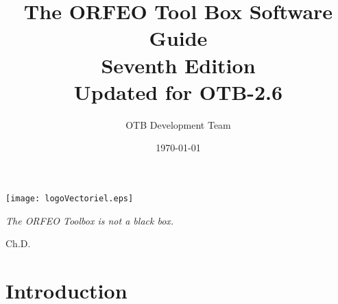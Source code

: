 \documentclass{InsightSoftwareGuide}
\title{The ORFEO Tool Box Software Guide\\ Seventh Edition\\ Updated
  for OTB-2.6}
\author{OTB Development Team}
\date{\today}
\newif\ifitkPrintedVersion
\begin{document}
\ifitkPrintedVersion
\fi

\maketitle

\frontmatter




%
%
\cleardoublepage

\begin{minipage}[t][10cm][b]{\textwidth}
\center
\texttt{[image: logoVectoriel.eps]}
\large
\begin{center}
\emph{The ORFEO Toolbox is not a black box.}\\
\end{center}
\hspace{8cm} Ch.D.
\normalsize
\end{minipage}



%
\pagestyle{plain}
%









%
%


%
\pagestyle{normal}
%
\small
\tableofcontents
\listoffigures
\listoftables
\normalsize




% 
% 

\mainmatter

\part{Introduction}
\end{document}
